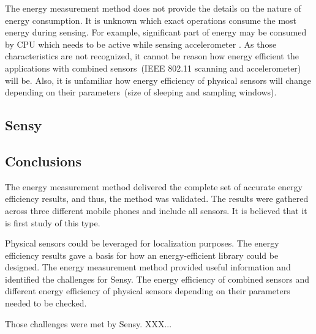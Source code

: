 The energy measurement method does not provide the details on the nature of energy consumption. It is unknown which exact operations consume the most energy during sensing. For example, significant part of energy may be consumed by CPU which needs to be active while sensing accelerometer \cite{priyantha:littlerock}. As those characteristics are not recognized, it cannot be reason how energy efficient the applications with combined sensors\ (IEEE 802.11 scanning and accelerometer) will be. Also, it is unfamiliar how energy efficiency of physical sensors will change depending on their parameters\ (size of sleeping and sampling windows).
						
\subsection{Sensy}
\subsection{Conclusions}
The energy measurement method delivered the complete set of accurate energy efficiency results, and thus, the method was validated. The results were gathered across three different mobile phones and include all sensors. It is believed that it is first study of this type. 

Physical sensors could be leveraged for localization purposes. The energy efficiency results gave a basis for how an energy-efficient library could be designed. The energy measurement method provided useful information and identified the challenges for Sensy. The energy efficiency of combined sensors and different energy efficiency of physical sensors depending on their parameters needed to be checked. 

Those challenges were met by Sensy. XXX...